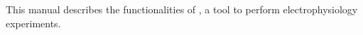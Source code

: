 This manual describes the functionalities of \progname, a tool to perform electrophysiology experiments.
